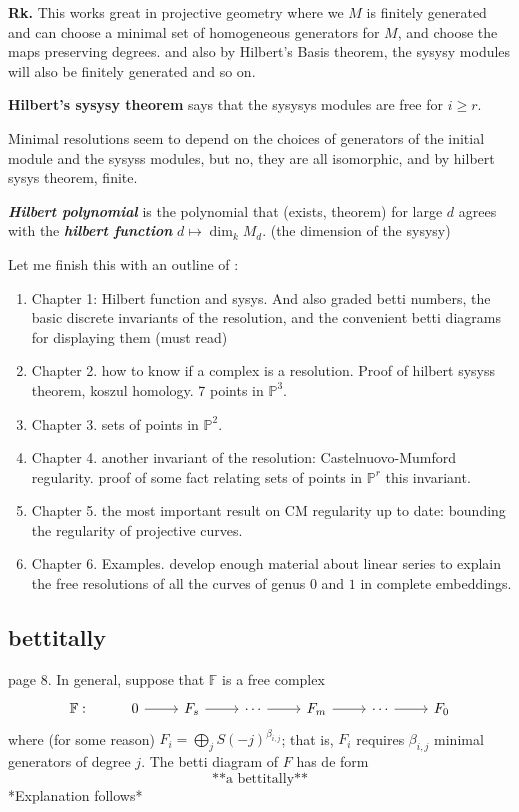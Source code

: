 \textbf{Rk.} This works great in projective geometry where we \(M\) is finitely generated and can choose a minimal set of homogeneous generators for \(M\), and choose the maps preserving degrees. and also by Hilbert's Basis theorem, the sysysy modules will also be finitely generated and so on.

\textbf{Hilbert's sysysy theorem} says that the sysysys modules are free for \(i \geq r\).

Minimal resolutions seem to depend on the choices of generators of the initial module and the sysyss modules, but no, they are all isomorphic, and by hilbert sysys theorem, finite.

\textbf{\textit{Hilbert polynomial}} is the polynomial that (exists, theorem) for large \(d\) agrees with the \textit{\textbf{hilbert function}} \(d \mapsto  \dim_k M_d\). (the dimension of the sysysy)

Let me finish this with an outline of \cite{sys}:
\begin{enumerate}
\item Chapter 1: Hilbert function and sysys. And also graded betti numbers, the basic discrete invariants of the resolution, and the convenient betti diagrams for displaying them (must read)
\item Chapter 2. how to know if a complex is a resolution. Proof of hilbert sysyss theorem, koszul homology. 7 points in \(\mathbb{P}^3\).
\item Chapter 3. sets of points in \(\mathbb{P}^2\).
\item Chapter 4. another invariant of the resolution: Castelnuovo-Mumford regularity. proof of some fact relating sets of points in \(\mathbb{P}^r\) this invariant.
\item Chapter 5. the most important result on CM regularity up to date: bounding the regularity of projective curves.
\item Chapter 6. Examples. develop enough material about linear series to explain the free resolutions of all the curves of genus \(0\) and \(1\) in complete embeddings.
\end{enumerate}

\subsection{bettitally}

\cite{sysy} page 8. In general, suppose that \(\mathbb{F}\) is a free complex
\[\begin{tikzcd}
	\mathbb{F}:& 0\arrow[r]& F_s \arrow[r]&  \cdots \arrow[r]&F_m\arrow[r]&\cdots \arrow[r]&F_0
\end{tikzcd}\]
where (for some reason)  \(F_i=\bigoplus_{j}S(-j)^{\beta_{i,j}}\); that is, \(F_i\) requires \(\beta_{i,j}\) minimal generators of degree \(j\). The betti diagram of \(F\) has de form
\[\text{**a bettitally**} \]
*Explanation follows*


